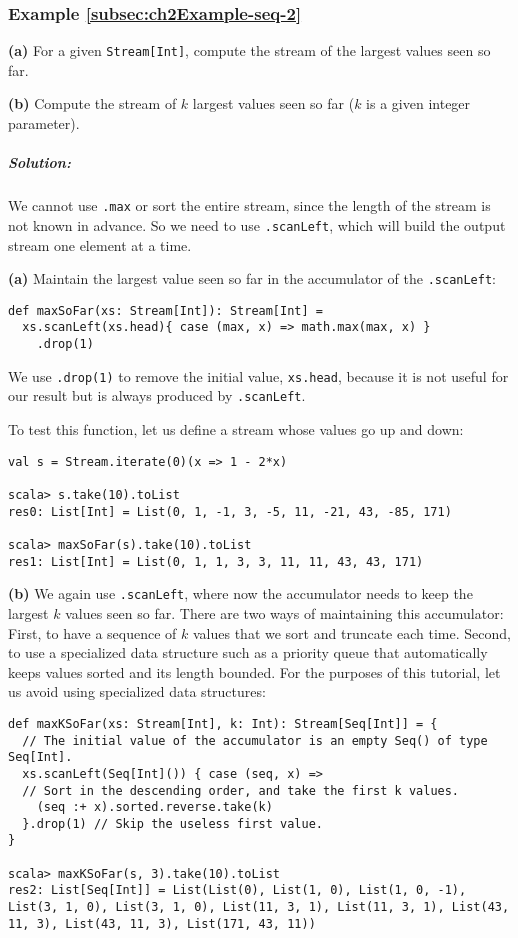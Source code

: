 \subsubsection{Example \label{subsec:ch2Example-seq-2}\ref{subsec:ch2Example-seq-2}}

\textbf{(a)} For a given \lstinline!Stream[Int]!, compute the stream
of the largest values seen so far.

\textbf{(b)} Compute the stream of $k$ largest values seen so far
($k$ is a given integer parameter).

\subparagraph{Solution:}

We cannot use \lstinline!.max! or sort the entire stream, since the
length of the stream is not known in advance. So we need to use \lstinline!.scanLeft!,
which will build the output stream one element at a time.

\textbf{(a)} Maintain the largest value seen so far in the accumulator
of the \lstinline!.scanLeft!:
\begin{lstlisting}
def maxSoFar(xs: Stream[Int]): Stream[Int] =
  xs.scanLeft(xs.head){ case (max, x) => math.max(max, x) }
    .drop(1)
\end{lstlisting}
We use \lstinline!.drop(1)! to remove the initial value, \lstinline!xs.head!,
because it is not useful for our result but is always produced by
\lstinline!.scanLeft!.

To test this function, let us define a stream whose values go up and
down:
\begin{lstlisting}
val s = Stream.iterate(0)(x => 1 - 2*x)

scala> s.take(10).toList
res0: List[Int] = List(0, 1, -1, 3, -5, 11, -21, 43, -85, 171)

scala> maxSoFar(s).take(10).toList
res1: List[Int] = List(0, 1, 1, 3, 3, 11, 11, 43, 43, 171)
\end{lstlisting}

\textbf{(b)} We again use \lstinline!.scanLeft!, where now the accumulator
needs to keep the largest $k$ values seen so far. There are two ways
of maintaining this accumulator: First, to have a sequence of $k$
values that we sort and truncate each time. Second, to use a specialized
data structure such as a priority queue that automatically keeps values
sorted and its length bounded. For the purposes of this tutorial,
let us avoid using specialized data structures:
\begin{lstlisting}
def maxKSoFar(xs: Stream[Int], k: Int): Stream[Seq[Int]] = {
  // The initial value of the accumulator is an empty Seq() of type Seq[Int].
  xs.scanLeft(Seq[Int]()) { case (seq, x) =>
  // Sort in the descending order, and take the first k values.
    (seq :+ x).sorted.reverse.take(k)
  }.drop(1) // Skip the useless first value.
}

scala> maxKSoFar(s, 3).take(10).toList
res2: List[Seq[Int]] = List(List(0), List(1, 0), List(1, 0, -1), List(3, 1, 0), List(3, 1, 0), List(11, 3, 1), List(11, 3, 1), List(43, 11, 3), List(43, 11, 3), List(171, 43, 11)) 
\end{lstlisting}


